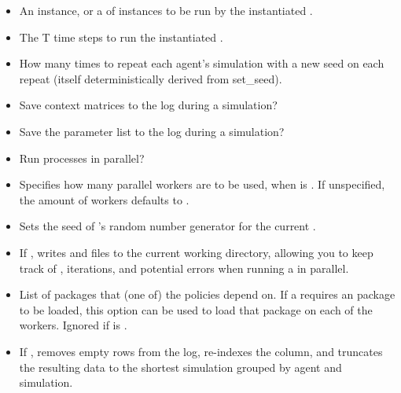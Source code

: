 \documentclass{jss}
\begin{document}
\begin{itemize}
   \item{}{
     \code{[NULL]} An  instance, or a  of  instances to be run by the instantiated .
   }
   \item{}{
      \code{[100]} The T time steps to run the instantiated .
   }
   \item{}{
      \code{[100]} How many times to repeat each agent's simulation with a new seed on each repeat (itself deterministically derived from set\_seed).
   }
   \item{}{
      \code{[FALSE]} Save context matrices  to the  log during a simulation?
   }
   \item{}{
     \code{[FALSE]}  Save the parameter list  to the  log during a simulation?
   }
   \item{}{
     \code{[TRUE]}  Run  processes in parallel?
   }
   \item{}{
      \code{[NULL]}  Specifies how many parallel workers are to be used, when  is . If unspecified, the amount of workers defaults to .
   }
   \item{}{
      \code{[0]}  Sets the seed of 's random number generator for the current .
   }
   \item{}{
       \code{[FALSE]}  If ,  writes  and 
       files to the current working directory, allowing you to keep track of , iterations,
       and potential errors when running a  in parallel.
   }
   \item{}{
       \code{[NULL]}  List of packages that (one of) the policies depend on. If a  requires an
        package to be loaded, this option can be used to load that package on each of the workers.
       Ignored if  is .
   }
   \item{}{
      \code{[FALSE]} If , removes empty rows from the  log,
      re-indexes the  column, and truncates the resulting data to the shortest simulation
      grouped by agent and simulation.
   }
\end{itemize}
\end{document}
